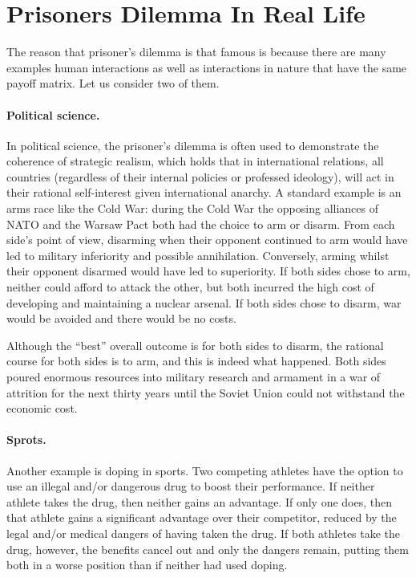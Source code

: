 \section{Prisoners Dilemma In Real Life}
The reason that prisoner's dilemma is that famous is because there are many
examples human interactions as well as interactions in nature that have the same
payoff matrix. Let us consider two of them.

\paragraph{Political science.} In political science, the prisoner's dilemma is
often used to demonstrate the coherence of strategic realism, which holds that
in international relations, all countries (regardless of their internal policies
or professed ideology), will act in their rational self-interest given
international anarchy. A standard example is an arms race like the Cold War:
during the Cold War the opposing alliances of NATO and the Warsaw Pact both had
the choice to arm or disarm. From each side's point of view, disarming when
their opponent continued to arm would have led to military inferiority and
possible annihilation. Conversely, arming whilst their opponent disarmed would
have led to superiority. If both sides chose to arm,
neither could afford to attack the other, but both incurred the high cost of
developing and maintaining a nuclear arsenal. If both sides chose to disarm, war
would be avoided and there would be no costs.

Although the ``best'' overall outcome is for both sides to disarm, the rational
course for both sides is to arm, and this is indeed what happened. Both sides
poured enormous resources into military research and armament in a war of
attrition for the next thirty years until the Soviet Union could not withstand
the economic cost. 

\paragraph{Sprots.} Another example is doping in sports. Two competing athletes
have the option to use an illegal and/or dangerous drug to boost their
performance. If neither athlete takes the drug, then neither gains an advantage.
If only one does, then that athlete gains a significant advantage over their
competitor, reduced by the legal and/or medical dangers of having taken the
drug. If both athletes take the drug, however, the benefits cancel out and only
the dangers remain, putting them both in a worse position than if neither had
used doping.
